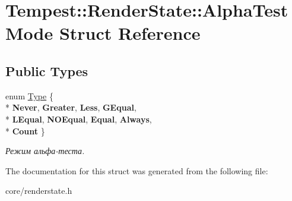 \hypertarget{struct_tempest_1_1_render_state_1_1_alpha_test_mode}{\section{Tempest\+:\+:Render\+State\+:\+:Alpha\+Test\+Mode Struct Reference}
\label{struct_tempest_1_1_render_state_1_1_alpha_test_mode}
}
\subsection*{Public Types}
\begin{DoxyCompactItemize}
\item 
\hypertarget{struct_tempest_1_1_render_state_1_1_alpha_test_mode_adce96ba2d2ef19eacfee189daee26fe9}{enum \hyperlink{struct_tempest_1_1_render_state_1_1_alpha_test_mode_adce96ba2d2ef19eacfee189daee26fe9}{Type} \{ \\*
{\bfseries Never}, 
{\bfseries Greater}, 
{\bfseries Less}, 
{\bfseries G\+Equal}, 
\\*
{\bfseries L\+Equal}, 
{\bfseries N\+O\+Equal}, 
{\bfseries Equal}, 
{\bfseries Always}, 
\\*
{\bfseries Count}
 \}}\label{struct_tempest_1_1_render_state_1_1_alpha_test_mode_adce96ba2d2ef19eacfee189daee26fe9}

\begin{DoxyCompactList}\small\item\em Режим альфа-\/теста. \end{DoxyCompactList}\end{DoxyCompactItemize}


The documentation for this struct was generated from the following file\+:\begin{DoxyCompactItemize}
\item 
core/renderstate.\+h\end{DoxyCompactItemize}
